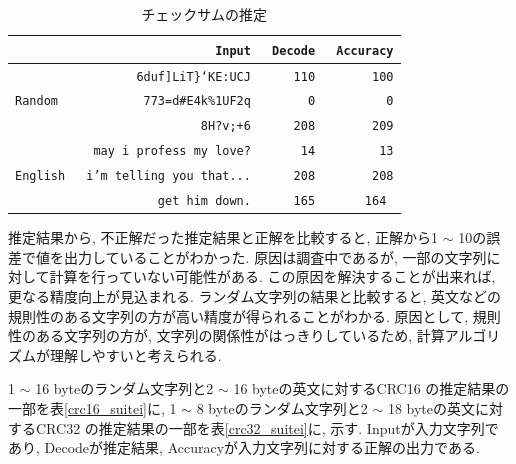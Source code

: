 \documentclass[11pt]{jbook}
\begin{document}
\begin{table}[htp]
   \begin{center}
    \caption{チェックサムの推定}
    \smallskip
    \begin{tabular}{|l|r|r|r|}
    \hline
       &\texttt{Input }&\texttt{Decode }&\texttt{Accuracy}   \\ \hline
     &\texttt{6duf]LiT\}`KE:UCJ }&\texttt{110 }&\texttt{100} \\ \cline{2-4}
    \texttt{Random }&\texttt{773=d\#E4k\%1UF2q }&\texttt{0 }&\texttt{0} \\ \cline{2-4}
    &\texttt{ 8H?v;+6 }&\texttt{208 }&\texttt{209}  \\ \hline
    &\texttt{may i profess my love?  }&\texttt{14 }&\texttt{13} \\ \cline{2-4}
   \texttt{English }&\texttt{i'm telling you that... }&\texttt{208 }&\texttt{208} \\ \cline{2-4}
   &\texttt{ get him down. }&\texttt{165 }&\texttt{164 } \\ \hline

    \end{tabular}
    \label{cksum_suitei}
   \end{center}

\end{table}


推定結果から, 不正解だった推定結果と正解を比較すると, 正解から1 $\sim$ 10の誤差で値を出力していることがわかった.
原因は調査中であるが, 一部の文字列に対して計算を行っていない可能性がある.
この原因を解決することが出来れば, 更なる精度向上が見込まれる.
ランダム文字列の結果と比較すると, 英文などの規則性のある文字列の方が高い精度が得られることがわかる.
原因として, 規則性のある文字列の方が, 文字列の関係性がはっきりしているため, 計算アルゴリズムが理解しやすいと考えられる.

\newpage

1 $\sim$ 16 byteのランダム文字列と2 $\sim$ 16 byteの英文に対するCRC16 の推定結果の一部を表\ref{crc16_suitei}に,
1 $\sim$ 8 byteのランダム文字列と2 $\sim$ 18 byteの英文に対するCRC32 の推定結果の一部を表\ref{crc32_suitei}に, 示す.
Inputが入力文字列であり, Decodeが推定結果, Accuracyが入力文字列に対する正解の出力である.\\
\end{document}
